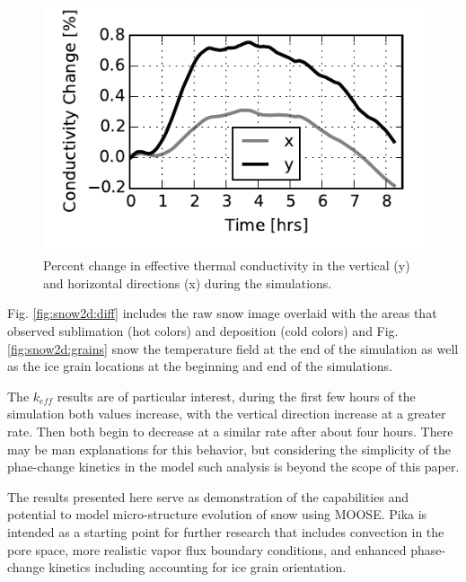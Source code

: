 \begin{figure}
  \includegraphics[width=\linewidth]{figures/pika_keff.pdf}
  \caption{Percent change in effective thermal conductivity in the vertical (y) and horizontal directions (x) during the simulations.}
  \label{fig:keff}
\end{figure}


Fig. \ref{fig:snow2d:diff} includes the raw snow image overlaid with the areas that observed sublimation (hot colors) and deposition (cold colors) and Fig. \ref{fig:snow2d:grains} snow the temperature field at the end of the simulation as well as the ice grain locations at the beginning and end of the simulations.

The $k_{eff}$ results are of particular interest, during the first few hours of the simulation both values increase, with the vertical direction increase at a greater rate. Then both begin to decrease at a similar rate after about four hours. There may be man explanations for this behavior, but considering the simplicity of the phae-change kinetics in the model such analysis is beyond the scope of this paper.

The results presented here serve as demonstration of the capabilities and potential to model micro-structure evolution of snow using MOOSE. Pika is intended as a starting point for further research that includes convection in the pore space, more realistic vapor flux boundary conditions, and enhanced phase-change kinetics including accounting for ice grain orientation.


